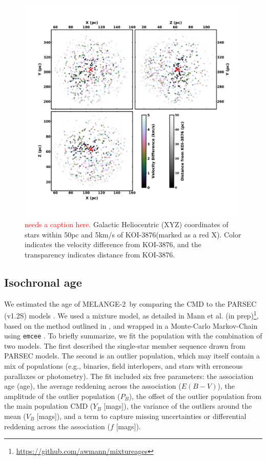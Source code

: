 \documentclass[twocolumn]{aastex631}
\newcommand{\starname}{KOI-3876}
\newcommand{\association}{MELANGE-2}
\begin{document}
\begin{figure}[tb]
    \centering
    \includegraphics[width=0.98\textwidth]{xyzSpaceFadedV2.pdf}
    \caption{\textcolor{red}{needs a caption here.} Galactic Heliocentric (XYZ) coordinates of stars within 50pc and 5km/s of \starname (marked as a red X). Color indicates the velocity difference from \starname, and the transparency indicates distance from \starname.}
    \label{fig:xyz}
\end{figure} 
    
\subsection{Isochronal age}

We estimated the age of \association\ by comparing the CMD to the PARSEC (v1.2S) models \citep{PARSEC}. We used a mixture model, as detailed in Mann et al. (in prep)\footnote{\url{https://github.com/awmann/mixtureages}}, based on the method outlined in \citet{HoggRecipes}, and wrapped in a Monte-Carlo Markov-Chain using \texttt{emcee} \citep{Foreman-Mackey2013}. To briefly summarize, we fit the population with the combination of two models. The first described the single-star member sequence drawn from PARSEC models. The second is an outlier population, which may itself contain a mix of populations (e.g., binaries, field interlopers, and stars with erroneous parallaxes or photometry). The fit included six free parameters: the association age (age), the average reddening across the association ($E(B-V)$), the amplitude of the outlier population ($P_B$), the offset of the outlier population from the main population CMD ($Y_B$ [mags]), the variance of the outliers around the mean ($V_B$ [mags]), and a term to capture missing uncertainties or differential reddening across the association ($f$ [mags]). 
\end{document}

